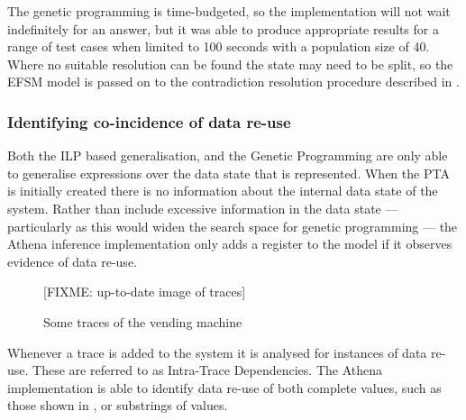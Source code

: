 The genetic programming is time-budgeted, so the implementation will not wait indefinitely for an answer, but it was able to produce appropriate results for a range of test cases when limited to 100 seconds with a population size of 40. Where no suitable resolution can be found the state may need to be split, so the EFSM model is passed on to the contradiction resolution procedure described in .

\subsubsection{Identifying co-incidence of data re-use}
\label{IntertraceDependencies}

Both the ILP based generalisation, and the Genetic Programming are only able to generalise expressions over the data state that is represented. When the PTA is initially created there is no information about the internal data state of the system. Rather than include excessive information in the data state --- particularly as this would widen the search space for genetic programming --- the Athena inference implementation only adds a register to the model if it observes evidence of data re-use.

\begin{figure}[h]
\begin{center}
[FIXME: up-to-date image of traces]
\caption{Some traces of the vending machine}
\label{fig:pta}
\end{center}
\end{figure}

Whenever a trace is added to the system it is analysed for instances of data re-use. These are referred to as Intra-Trace Dependencies. The Athena implementation is able to identify data re-use of both complete values, such as those shown in , or substrings of values. 


